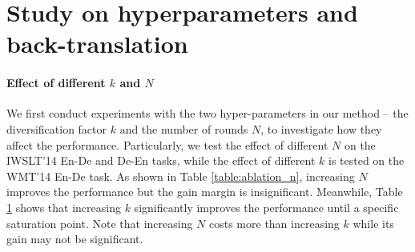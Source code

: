 \documentclass{article}
\begin{document}
\section{Study on hyperparameters and back-translation}




\paragraph{Effect of different $k$ and $N$}

We first conduct experiments with the two hyper-parameters in our method -- the diversification factor $k$ and the number of rounds $N$, to investigate how they affect the performance. Particularly, we test the effect of different $N$ on the IWSLT'14 En-De and De-En tasks, while the effect of different $k$ is tested on the WMT'14 En-De task. As shown in Table \ref{table:ablation_n}, increasing $N$ improves the performance but the gain margin is insignificant. Meanwhile, Table \ref{table:ablation_k} shows that increasing $k$ significantly improves the performance until a specific saturation point. Note that increasing $N$ costs more than increasing $k$ while its gain may not be significant.

\begin{figure}[t!]
\vspace{-1em}
\begin{minipage}[t]{0.45\textwidth}
\centering
{}
\label{table:ablation_n}
\vspace{-0.5em}
\end{minipage}
\hfill
\begin{minipage}[t]{0.51\textwidth}
\centering
{}
\label{table:ablation_k}
\vspace{-0.5em}
\end{minipage}
\end{figure}
\end{document}
